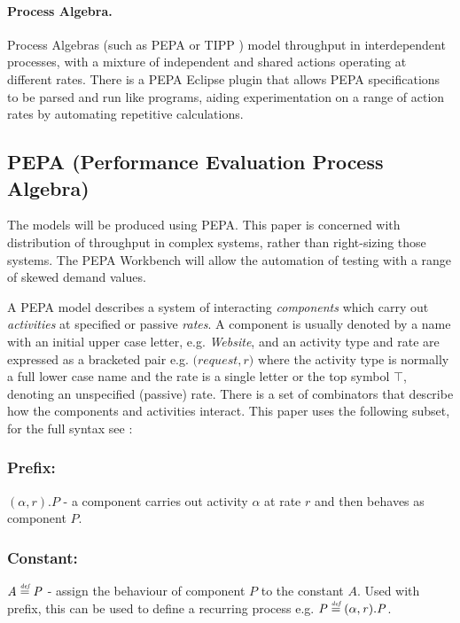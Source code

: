 \documentclass[runningheads]{llncs}
\begin{document}
\paragraph{Process Algebra.} Process Algebras (such as PEPA or TIPP \cite{RN64}) model throughput in interdependent processes, with a mixture of independent and shared actions operating at different rates.  There is a PEPA Eclipse plugin \cite{RN1080} that allows PEPA specifications to be parsed and run like programs, aiding experimentation on a range of action rates by automating repetitive calculations.

\subsection{PEPA (Performance Evaluation Process Algebra)}

The models will be produced using PEPA.  This paper is concerned with distribution of throughput in complex systems, rather than right-sizing those systems.  The PEPA Workbench will allow the automation of testing with a range of skewed demand values.

A PEPA model describes a system of interacting {\itshape components} which carry out {\itshape activities} at specified or passive {\itshape rates}.  A component is usually denoted by a name with an initial upper case letter, e.g. {\itshape Website}, and an activity type and rate are expressed as a bracketed pair e.g. $\mathit(request, r)$ where the activity type is normally a full lower case name and the rate is a single letter or the top symbol $\top$, denoting an unspecified (passive) rate.  There is a set of combinators that describe how the components and activities interact.  This paper uses the following subset, for the full syntax see {\cite{RN1051}}:

\subsubsection{Prefix:} $(\mathit{\alpha},\mathit{r}).\mathit{P}$ - a component carries out activity $\mathit{\alpha}$ at rate $\mathit{r}$ and then behaves as component $\mathit{P}$.
\subsubsection{Constant:} $\mathit{A} \stackrel{\mbox{\em {\tiny def}}}{=} \mathit{P}$ - assign the behaviour of component $\mathit{P}$ to the constant $\mathit{A}$.  Used with prefix, this can be used to define a recurring process e.g. $\mathit{P} \stackrel{\mbox{\em {\tiny def}}}{=} (\mathit{\alpha},\mathit{r}).\mathit{P}$.
\end{document}

